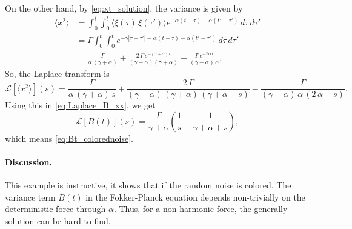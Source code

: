 \documentclass{article}
\begin{document}
On the other hand,
by \eqref{eq:xt_solution}, the variance is given by
$$
\begin{aligned}
\langle x^2 \rangle
&=
\int_0^t\int_0^t \langle \xi(\tau) \, \xi(\tau') \rangle
e^{-\alpha(t-\tau)-\alpha(t'-\tau')} \, d\tau \, d\tau'
\\
&=
\Gamma \int_0^t\int_0^t
e^{-\gamma|\tau - \tau'|-\alpha(t-\tau)-\alpha(t'-\tau')} \, d\tau \, d\tau'
\\
&=
  \frac{\Gamma }{\alpha\,(\gamma + \alpha) }
  +
  \frac{2 \, \Gamma \, e^{-(\gamma + \alpha) \, t} }{(\gamma - \alpha) (\gamma + \alpha) }
  -
  \frac{\Gamma \, e^{-2 \, \alpha \, t} }{(\gamma - \alpha) \, \alpha }.
\end{aligned}
$$
So, the Laplace transform is
$$
\mathcal L[\langle x^2 \rangle](s)
=
  \frac{ \Gamma } { \alpha \, (\gamma + \alpha) \, s }
  +
  \frac{ 2 \, \Gamma } { (\gamma - \alpha) \, (\gamma + \alpha) \, (\gamma + \alpha + s) }
  -
  \frac{ \Gamma } { (\gamma - \alpha ) \, \alpha \, (2 \, \alpha + s) }.
$$
Using this in \eqref{eq:Laplace_B_xx}, we get
$$
\mathcal L[B(t)](s) =
  \frac{ \Gamma }{ \gamma + \alpha }
  \left( \frac{1}{s} - \frac{1}{ \gamma + \alpha + s } \right),
$$
which means \eqref{eq:Bt_colorednoise}.

\paragraph{Discussion.}

This example is instructive,
it shows that if the random noise is colored.
%
The variance term $B(t)$ in the Fokker-Planck equation
depends non-trivially on the deterministic force through $\alpha$.
%
Thus, for a non-harmonic force, the generally solution
can be hard to find.
\end{document}
